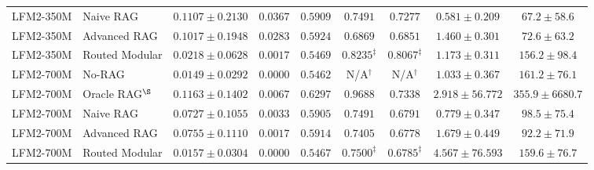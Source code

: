 \documentclass[10pt]{article}
\begin{document}
\begin{table}[t]
\begin{tabular}{llccccccc}
LFM2-350M & Naive RAG & $0.1107 \pm 0.2130$ & $\mathbf{0.0367}$ & $0.5909$ & $0.7491$ & $0.7277$ & $0.581 \pm 0.209$ & $67.2 \pm 58.6$ \\
LFM2-350M & Advanced RAG & $0.1017 \pm 0.1948$ & $0.0283$ & $0.5924$ & $0.6869$ & $0.6851$ & $1.460 \pm 0.301$ & $72.6 \pm 63.2$ \\
LFM2-350M & Routed Modular & $0.0218 \pm 0.0628$ & $0.0017$ & $0.5469$ & $0.8235^{\ddagger}$ & $\mathbf{0.8067}^{\ddagger}$ & $1.173 \pm 0.311$ & $156.2 \pm 98.4$ \\
\midrule
LFM2-700M & No-RAG & $0.0149 \pm 0.0292$ & $0.0000$ & $0.5462$ & N/A$^{\dagger}$ & N/A$^{\dagger}$ & $1.033 \pm 0.367$ & $161.2 \pm 76.1$ \\
LFM2-700M & Oracle RAG$^{\S}$ & $0.1163 \pm 0.1402$ & $0.0067$ & $\mathbf{0.6297}$ & $0.9688$ & $0.7338$ & $2.918 \pm 56.772$ & $355.9 \pm 6680.7$ \\
LFM2-700M & Naive RAG & $0.0727 \pm 0.1055$ & $0.0033$ & $0.5905$ & $0.7491$ & $0.6791$ & $0.779 \pm 0.347$ & $98.5 \pm 75.4$ \\
LFM2-700M & Advanced RAG & $0.0755 \pm 0.1110$ & $0.0017$ & $0.5914$ & $0.7405$ & $0.6778$ & $1.679 \pm 0.449$ & $92.2 \pm 71.9$ \\
LFM2-700M & Routed Modular & $0.0157 \pm 0.0304$ & $0.0000$ & $0.5467$ & $0.7500^{\ddagger}$ & $0.6785^{\ddagger}$ & $4.567 \pm 76.593$ & $159.6 \pm 76.7$ \\
\bottomrule
\end{tabular}
\end{table}
\end{document}
